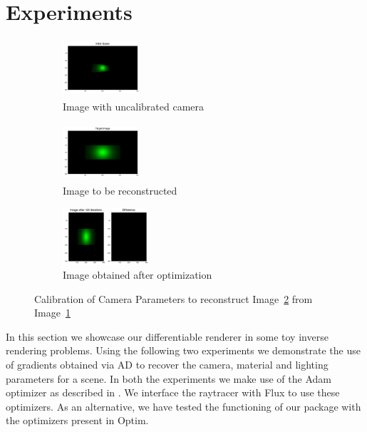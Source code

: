 \documentclass{juliacon}
\begin{document}
\section{Experiments}

\begin{figure}[!htb]
    \centering
    \begin{subfigure}[c]{0.26\textwidth}
        \centering
        \includegraphics[width=107px, height=80px]{images/camera/initial_guess_image.png}
        \caption{Image with uncalibrated camera}
        \label{fig:cam_guess}
    \end{subfigure}
    \hfill
    \begin{subfigure}[c]{0.26\textwidth}
        \centering          
        \includegraphics[width=107px, height=80px]{images/camera/target_image.png}
        \caption{Image to be reconstructed}
        \label{fig:cam_target}
    \end{subfigure}
    \centering
    \begin{subfigure}[c]{0.47\textwidth}
        \centering
        \includegraphics[width=\textwidth, height=80px]{images/camera/iter_120.png}
        \caption{Image obtained after optimization}
    \end{subfigure}
    \caption{Calibration of Camera Parameters to reconstruct Image~\ref{fig:cam_target} from Image~\ref{fig:cam_guess}}
    \label{fig:cam_invrender}
\end{figure}

In this section we showcase our differentiable renderer in some toy inverse rendering problems. Using the following two experiments we demonstrate the use of gradients obtained via AD to recover the camera, material and lighting parameters for a scene. In both the experiments we make use of the Adam optimizer as described in \cite{kingma2014adam}. We interface the raytracer with Flux to use these optimizers. As an alternative, we have tested the functioning of our package with the optimizers present in Optim.
\end{document}
